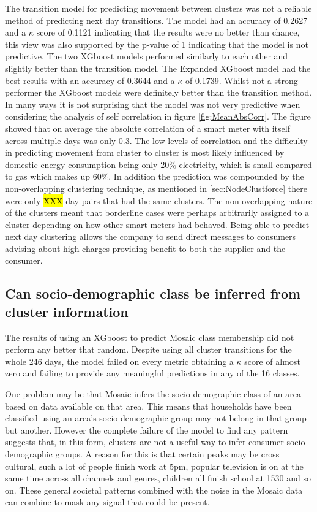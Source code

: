 The transition model for predicting movement between clusters was not a reliable method of predicting next day transitions. The model had an accuracy of 0.2627 and a $\kappa$ score of 0.1121 indicating that the results were no better than chance, this view was also supported by the p-value of 1 indicating that the model is not predictive. The two XGboost models performed similarly to each other and slightly better than the transition model. The Expanded XGboost model had the best results with an accuracy of 0.3644 and a $\kappa$ of 0.1739. Whilst not a strong performer the XGboost models were definitely better than the transition method. In many ways it is not surprising that the model was not very predictive when considering the analysis of self correlation in figure \ref{fig:MeanAbsCorr}. The figure showed that on average the absolute correlation of a smart meter with itself across multiple days was only 0.3. The low levels of correlation and the difficulty in predicting movement from cluster to cluster is most likely influenced by domestic energy consumption being only 20\% electricity, which is small compared to gas which makes up 60\%. In addition the prediction was compounded by the non-overlapping clustering technique, as mentioned in \ref{sec:NodeClustforce} there were only \hl{XXX} day pairs that had the same clusters. The non-overlapping nature of the clusters meant that borderline cases were perhaps arbitrarily assigned to a cluster depending on how other smart meters had behaved. Being able to predict next day clustering allows the company to send direct messages to consumers advising about high charges providing benefit to both the supplier and the consumer.

\subsection{Can socio-demographic class be inferred from cluster information}
The results of using an XGboost to predict Mosaic class membership did not perform any better that random. Despite using all cluster transitions for the whole 246 days, the model failed on every metric obtaining a $\kappa$ score of almost zero and failing to provide any meaningful predictions in any of the 16 classes. 

One problem may be that Mosaic infers the socio-demographic class of an area based on data available on that area. This means that households have been classified using an area's  socio-demographic group may not belong in that group but another. However the complete failure of the model to find any pattern suggests that, in this form, clusters are not a useful way to infer consumer socio-demographic groups. A reason for this is that certain peaks may be cross cultural, such a lot of people finish work at 5pm, popular television is on at the same time across all channels and genres, children all finish school at 1530 and so on. These general societal patterns combined with the noise in the Mosaic data can combine to mask any signal that could be present. 

